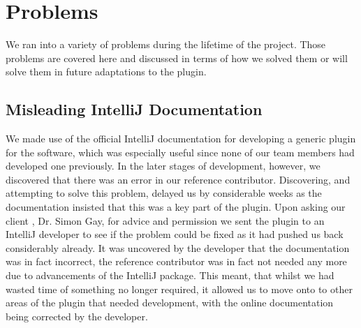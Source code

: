 \documentclass{l3proj}
\begin{document}
\section{Problems}
We ran into a variety of problems during the lifetime of the project. Those problems are covered here and discussed in terms of how we solved them or will solve them in future adaptations to the plugin. 

\subsection {Misleading IntelliJ Documentation}
We made use of the official IntelliJ documentation for developing a generic plugin for the software, which was especially useful since none of our team members had developed one previously. In the later stages of development, however, we discovered that there was an error in our reference contributor. Discovering, and attempting to solve this problem, delayed us by considerable weeks as the documentation insisted that this was a key part of the plugin. Upon asking our client , Dr. Simon Gay, for advice and permission we sent the plugin to an IntelliJ developer to see if the problem could be fixed as it had pushed us back considerably already. It was uncovered by the developer that the documentation was in fact incorrect, the reference contributor was in fact not needed any more due to advancements of the IntelliJ package. This meant, that whilst we had wasted time of something no longer required, it allowed us to move onto to other areas of the plugin that needed development, with the online documentation being corrected by the developer. 
\end{document}
